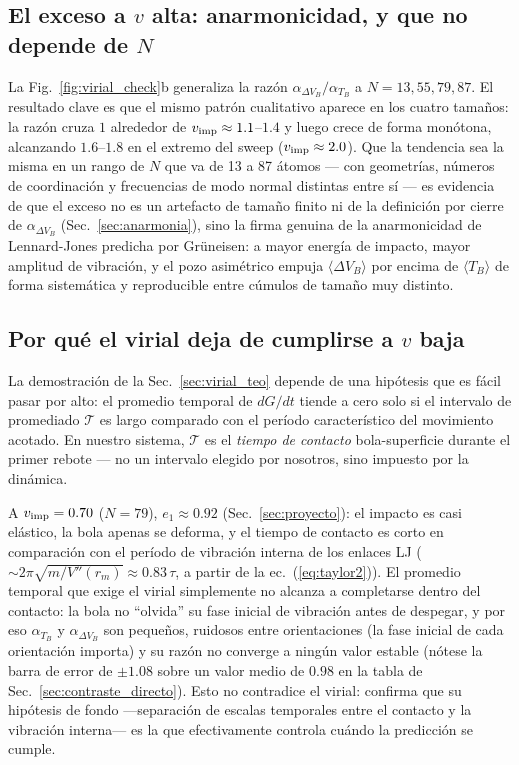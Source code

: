 \documentclass[11pt,a4paper]{article}
\begin{document}
\subsection{El exceso a $v$ alta: anarmonicidad, y que no depende de $N$}
\label{sec:exceso_v_alta}

La Fig.~\ref{fig:virial_check}b generaliza la razón
$\alpha_{\Delta V_B}/\alpha_{T_B}$ a $N=13,55,79,87$. El resultado clave es
que el mismo patrón cualitativo aparece en los cuatro tamaños: la razón
cruza $1$ alrededor de $v_{\rm imp}\approx1.1$--$1.4$ y luego crece de
forma monótona, alcanzando $1.6$--$1.8$ en el extremo del sweep
($v_{\rm imp}\approx2.0$). Que la tendencia sea la misma en un rango de
$N$ que va de 13 a 87 átomos --- con geometrías, números de coordinación y
frecuencias de modo normal distintas entre sí --- es evidencia de que el
exceso no es un artefacto de tamaño finito ni de la definición por cierre
de $\alpha_{\Delta V_B}$ (Sec.~\ref{sec:anarmonia}), sino la firma genuina
de la anarmonicidad de Lennard-Jones predicha por Grüneisen: a mayor
energía de impacto, mayor amplitud de vibración, y el pozo asimétrico
empuja $\langle\Delta V_B\rangle$ por encima de $\langle T_B\rangle$ de
forma sistemática y reproducible entre cúmulos de tamaño muy distinto.

\subsection{Por qué el virial deja de cumplirse a $v$ baja}
\label{sec:falla_v_baja}

La demostración de la Sec.~\ref{sec:virial_teo} depende de una hipótesis
que es fácil pasar por alto: el promedio temporal de $dG/dt$ tiende a cero
solo si el intervalo de promediado $\mathcal T$ es largo comparado con el
período característico del movimiento acotado. En nuestro sistema,
$\mathcal T$ es el \emph{tiempo de contacto} bola-superficie durante el
primer rebote --- no un intervalo elegido por nosotros, sino impuesto por
la dinámica.

A $v_{\rm imp}=0.70$ ($N=79$), $e_1\approx0.92$ (Sec.~\ref{sec:proyecto}):
el impacto es casi elástico, la bola apenas se deforma, y el tiempo de
contacto es corto en comparación con el período de vibración interna de
los enlaces LJ ($\sim2\pi\sqrt{m/V''(r_m)}\approx0.83\,\tau$, a partir de
la ec.~(\ref{eq:taylor2})). El promedio temporal que exige el virial
simplemente no alcanza a completarse dentro del contacto: la bola no
``olvida'' su fase inicial de vibración antes de despegar, y por eso
$\alpha_{T_B}$ y $\alpha_{\Delta V_B}$ son pequeños, ruidosos entre
orientaciones (la fase inicial de cada orientación importa) y su razón no
converge a ningún valor estable (nótese la barra de error de
$\pm1.08$ sobre un valor medio de $0.98$ en la tabla de
Sec.~\ref{sec:contraste_directo}). Esto no contradice el virial: confirma
que su hipótesis de fondo ---separación de escalas temporales entre el
contacto y la vibración interna--- es la que efectivamente controla cuándo
la predicción se cumple.
\end{document}
